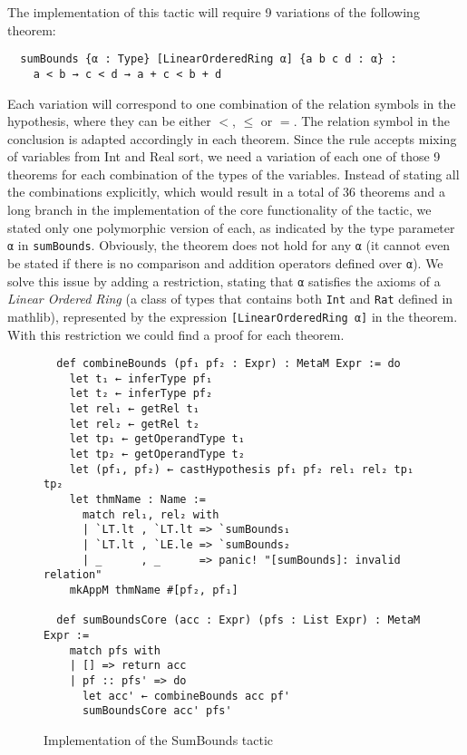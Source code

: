The implementation of this tactic will require 9 variations of the following theorem:

\begin{verbatim}
  sumBounds {α : Type} [LinearOrderedRing α] {a b c d : α} :
    a < b → c < d → a + c < b + d
\end{verbatim}

Each variation will correspond to one combination of the relation symbols in the hypothesis, where
they can be either $<$, $\le$ or $=$. The relation symbol in the
conclusion is adapted accordingly in each theorem. Since the rule accepts mixing of variables
from Int and Real sort, we need a variation of each one of those 9 theorems for each combination
of the types of the variables. Instead of stating all the combinations explicitly, which would
result in a total of 36 theorems and a long branch in the implementation of the core functionality of the tactic,
we stated only one polymorphic version of each, as indicated by the type parameter \texttt{α} in \texttt{sumBounds}.
Obviously, the theorem does not hold
for any \texttt{α} (it cannot even be stated if there is no comparison and addition operators defined over \texttt{α}).
We solve this issue by adding a restriction, stating that \texttt{α} satisfies the axioms of a
\textit{Linear Ordered Ring} (a class of types that contains both \texttt{Int} and \texttt{Rat} defined in mathlib), represented by the expression \texttt{[LinearOrderedRing α]} in the theorem. With this restriction we
could find a proof for each theorem.

\begin{figure}[t]
\begin{verbatim}
  def combineBounds (pf₁ pf₂ : Expr) : MetaM Expr := do
    let t₁ ← inferType pf₁
    let t₂ ← inferType pf₂
    let rel₁ ← getRel t₁
    let rel₂ ← getRel t₂
    let tp₁ ← getOperandType t₁
    let tp₂ ← getOperandType t₂
    let (pf₁, pf₂) ← castHypothesis pf₁ pf₂ rel₁ rel₂ tp₁ tp₂
    let thmName : Name :=
      match rel₁, rel₂ with
      | `LT.lt , `LT.lt => `sumBounds₁
      | `LT.lt , `LE.le => `sumBounds₂
      | _      , _      => panic! "[sumBounds]: invalid relation"
    mkAppM thmName #[pf₂, pf₁]

  def sumBoundsCore (acc : Expr) (pfs : List Expr) : MetaM Expr :=
    match pfs with
    | [] => return acc
    | pf :: pfs' => do
      let acc' ← combineBounds acc pf'
      sumBoundsCore acc' pfs'
\end{verbatim}
\caption{Implementation of the SumBounds tactic}
\end{figure}

